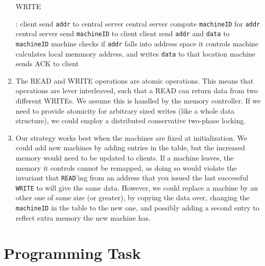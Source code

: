 \documentclass[11pt,a4paper,english]{article}
\begin{document}
\begin{enumerate}
\begin{algorithm}[H]
\caption{WRITE}
\begin{algorithmic}[1]
:
\State client send \texttt{addr} to central server
\State central server compute \texttt{machineID} for \texttt{addr}
\State central server send \texttt{machineID} to client
\smallskip
\State client send \texttt{addr} and \texttt{data} to \texttt{machineID}
\State machine checks if \texttt{addr} falls into address space it controls
\State machine calculates local memmory address, and writes \texttt{data} to that location
\State machine sends ACK to client
\EndProcedure
\end{algorithmic}
\end{algorithm}

\item The READ and WRITE operations are atomic operations. This means that
  operations are lever interleaved, such that a READ can return data from two
  different WRITEs. We assume this is handled by the memory controller. If we
  need to provide atomicity for arbitrary sized writes (like a whole data
  structure), we could employ a distributed conservative two-phase locking.

\item Our strategy works best when the machines are fixed at initialization. We
  could add new machines by adding entries in the table, but the increased
  memory would need to be updated to clients. If a machine leaves, the memory it
  controls cannot be remapped, as doing so would violate the invariant that
  \texttt{READ}'ing from an address that you issued the last successful
  \texttt{WRITE} to will give the same data. However, we could replace a machine
  by an other one of same size (or greater), by copying the data over, changing
  the \texttt{machineID} in the table to the new one, and possibly adding a
  second entry to reflect extra memory the new machine has.

\end{enumerate}



\section{Programming Task}
\end{document}
